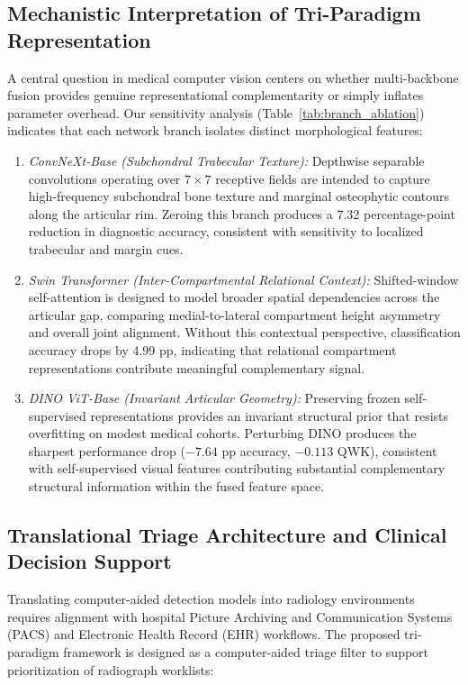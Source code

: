 \documentclass[10pt,journal]{IEEEtran}
\begin{document}
\subsection{Mechanistic Interpretation of Tri-Paradigm Representation}
\label{subsec:representation_mechanisms}

A central question in medical computer vision centers on whether multi-backbone fusion provides genuine representational complementarity or simply inflates parameter overhead. Our sensitivity analysis (Table~\ref{tab:branch_ablation}) indicates that each network branch isolates distinct morphological features:

\begin{enumerate}[leftmargin=*]
\item \textit{ConvNeXt-Base (Subchondral Trabecular Texture):} Depthwise separable convolutions operating over $7 \times 7$ receptive fields are intended to capture high-frequency subchondral bone texture and marginal osteophytic contours along the articular rim. Zeroing this branch produces a 7.32 percentage-point reduction in diagnostic accuracy, consistent with sensitivity to localized trabecular and margin cues.
\item \textit{Swin Transformer (Inter-Compartmental Relational Context):} Shifted-window self-attention is designed to model broader spatial dependencies across the articular gap, comparing medial-to-lateral compartment height asymmetry and overall joint alignment. Without this contextual perspective, classification accuracy drops by 4.99 pp, indicating that relational compartment representations contribute meaningful complementary signal.
\item \textit{DINO ViT-Base (Invariant Articular Geometry):} Preserving frozen self-supervised representations provides an invariant structural prior that resists overfitting on modest medical cohorts. Perturbing DINO produces the sharpest performance drop ($-7.64$ pp accuracy, $-0.113$ QWK), consistent with self-supervised visual features contributing substantial complementary structural information within the fused feature space.
\end{enumerate}

\subsection{Translational Triage Architecture and Clinical Decision Support}
\label{subsec:clinical_workflow}

Translating computer-aided detection models into radiology environments requires alignment with hospital Picture Archiving and Communication Systems (PACS) and Electronic Health Record (EHR) workflows. The proposed tri-paradigm framework is designed as a computer-aided triage filter to support prioritization of radiograph worklists:
\end{document}
